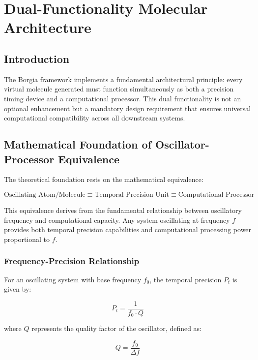 \section{Dual-Functionality Molecular Architecture}

\subsection{Introduction}

The Borgia framework implements a fundamental architectural principle: every virtual molecule generated must function simultaneously as both a precision timing device and a computational processor. This dual functionality is not an optional enhancement but a mandatory design requirement that ensures universal computational compatibility across all downstream systems.

\subsection{Mathematical Foundation of Oscillator-Processor Equivalence}

The theoretical foundation rests on the mathematical equivalence:

\begin{equation}
\text{Oscillating Atom/Molecule} \equiv \text{Temporal Precision Unit} \equiv \text{Computational Processor}
\end{equation}

This equivalence derives from the fundamental relationship between oscillatory frequency and computational capacity. Any system oscillating at frequency $f$ provides both temporal precision capabilities and computational processing power proportional to $f$.

\subsubsection{Frequency-Precision Relationship}

For an oscillating system with base frequency $f_0$, the temporal precision $P_t$ is given by:

\begin{equation}
P_t = \frac{1}{f_0 \cdot Q}
\end{equation}

where $Q$ represents the quality factor of the oscillator, defined as:

\begin{equation}
Q = \frac{f_0}{\Delta f}
\end{equation}

